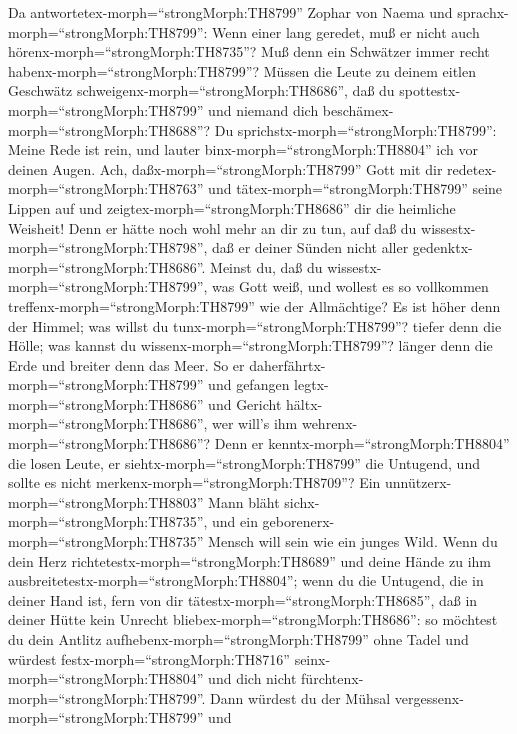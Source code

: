  Da antwortetex-morph=``strongMorph:TH8799'' Zophar von
Naema und sprachx-morph=``strongMorph:TH8799'':  Wenn einer
lang geredet, muß er nicht auch hörenx-morph=``strongMorph:TH8735''? Muß
denn ein Schwätzer immer recht habenx-morph=``strongMorph:TH8799''?
 Müssen die Leute zu deinem eitlen Geschwätz
schweigenx-morph=``strongMorph:TH8686'', daß du
spottestx-morph=``strongMorph:TH8799'' und niemand dich
beschämex-morph=``strongMorph:TH8688''?  Du
sprichstx-morph=``strongMorph:TH8799'': Meine Rede ist rein, und lauter
binx-morph=``strongMorph:TH8804'' ich vor deinen Augen. 
Ach, daßx-morph=``strongMorph:TH8799'' Gott mit dir
redetex-morph=``strongMorph:TH8763'' und
tätex-morph=``strongMorph:TH8799'' seine Lippen auf  und
zeigtex-morph=``strongMorph:TH8686'' dir die heimliche Weisheit! Denn er
hätte noch wohl mehr an dir zu tun, auf daß du
wissestx-morph=``strongMorph:TH8798'', daß er deiner Sünden nicht aller
gedenktx-morph=``strongMorph:TH8686''.  Meinst du, daß du
wissestx-morph=``strongMorph:TH8799'', was Gott weiß, und wollest es so
vollkommen treffenx-morph=``strongMorph:TH8799'' wie der Allmächtige?
 Es ist höher denn der Himmel; was willst du
tunx-morph=``strongMorph:TH8799''? tiefer denn die Hölle; was kannst du
wissenx-morph=``strongMorph:TH8799''?  länger denn die Erde
und breiter denn das Meer.  So er
daherfährtx-morph=``strongMorph:TH8799'' und gefangen
legtx-morph=``strongMorph:TH8686'' und Gericht
hältx-morph=``strongMorph:TH8686'', wer will's ihm
wehrenx-morph=``strongMorph:TH8686''?  Denn er
kenntx-morph=``strongMorph:TH8804'' die losen Leute, er
siehtx-morph=``strongMorph:TH8799'' die Untugend, und sollte es nicht
merkenx-morph=``strongMorph:TH8709''?  Ein
unnützerx-morph=``strongMorph:TH8803'' Mann bläht
sichx-morph=``strongMorph:TH8735'', und ein
geborenerx-morph=``strongMorph:TH8735'' Mensch will sein wie ein junges
Wild.  Wenn du dein Herz
richtetestx-morph=``strongMorph:TH8689'' und deine Hände zu ihm
ausbreitetestx-morph=``strongMorph:TH8804'';  wenn du die
Untugend, die in deiner Hand ist, fern von dir
tätestx-morph=``strongMorph:TH8685'', daß in deiner Hütte kein Unrecht
bliebex-morph=``strongMorph:TH8686'':  so möchtest du dein
Antlitz aufhebenx-morph=``strongMorph:TH8799'' ohne Tadel und würdest
festx-morph=``strongMorph:TH8716'' seinx-morph=``strongMorph:TH8804''
und dich nicht fürchtenx-morph=``strongMorph:TH8799''. 
Dann würdest du der Mühsal vergessenx-morph=``strongMorph:TH8799'' und
